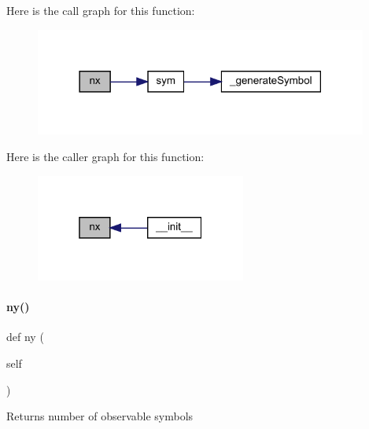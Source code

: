 Here is the call graph for this function\+:
\nopagebreak
\begin{figure}[H]
\begin{center}
\leavevmode
\includegraphics[width=310pt]{classamici_1_1ode__export_1_1_o_d_e_model_a43830bc0d4337068016ab3f290e3cdca_cgraph}
\end{center}
\end{figure}
Here is the caller graph for this function\+:
\nopagebreak
\begin{figure}[H]
\begin{center}
\leavevmode
\includegraphics[width=196pt]{classamici_1_1ode__export_1_1_o_d_e_model_a43830bc0d4337068016ab3f290e3cdca_icgraph}
\end{center}
\end{figure}
\mbox{\label{classamici_1_1ode__export_1_1_o_d_e_model_ac3d9b681827ebea0e5bee18c9d7fc44d}} 
\paragraph{\texorpdfstring{ny()}{ny()}}
{\footnotesize\ttfamily def ny (\begin{DoxyParamCaption}\item[{}]{self }\end{DoxyParamCaption})}

\begin{DoxyReturn}{Returns}
number of observable symbols 
\end{DoxyReturn}


